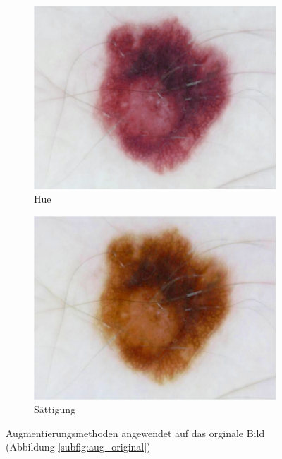\begin{figure}[t]
\begin{subfigure}[t]{0.24\linewidth}
		\includegraphics[width=\textwidth]{./pics/augmentations/hue.png}
		\caption{Hue}
		\label{subfig:aug_hue}
	\end{subfigure}
	\begin{subfigure}[t]{0.24\linewidth}
		\includegraphics[width=\textwidth]{./pics/augmentations/saturation.png}
		\caption{Sättigung}
		\label{subfig:aug_sat}
	\end{subfigure}
	\caption{Augmentierungsmethoden angewendet auf das orginale Bild (Abbildung \ref{subfig:aug_original})}
\end{figure}


